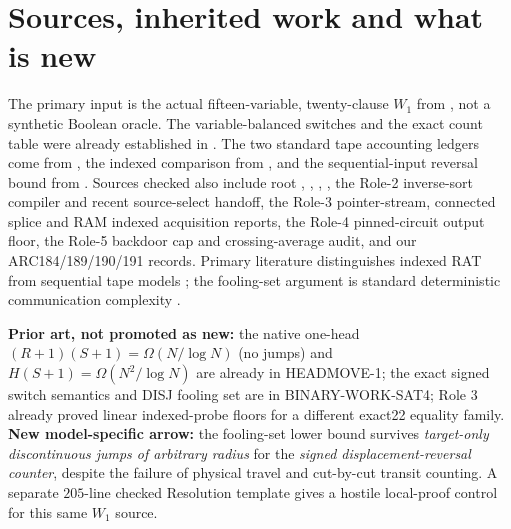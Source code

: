 \documentclass[11pt]{article}
\begin{document}
\section{Sources, inherited work and what is new}
The primary input is the actual fifteen-variable, twenty-clause $W_1$ from , not a synthetic Boolean oracle. The variable-balanced switches and the exact count table were already established in . The two standard tape accounting ledgers come from , the indexed comparison from , and the sequential-input reversal bound from . Sources checked also include root , , , , the Role-2 inverse-sort compiler and recent source-select handoff, the Role-3 pointer-stream, connected splice and RAM indexed acquisition reports, the Role-4 pinned-circuit output floor, the Role-5 backdoor cap and crossing-average audit, and our ARC184/189/190/191 records. Primary literature distinguishes indexed RAT from sequential tape models \cite{FLMV,VMsurvey}; the fooling-set argument is standard deterministic communication complexity \cite{Roughgarden}.

\textbf{Prior art, not promoted as new:} the native one-head $(R+1)(S+1)=\Omega(N/\log N)$ (no jumps) and $H(S+1)=\Omega(N^2/\log N)$ are already in HEADMOVE-1; the exact signed switch semantics and DISJ fooling set are in BINARY-WORK-SAT4; Role 3 already proved linear indexed-probe floors for a different exact22 equality family. \textbf{New model-specific arrow:} the fooling-set lower bound survives \emph{target-only discontinuous jumps of arbitrary radius} for the \emph{signed displacement-reversal counter}, despite the failure of physical travel and cut-by-cut transit counting. A separate $205$-line checked Resolution template gives a hostile local-proof control for this same $W_1$ source.
\end{document}
